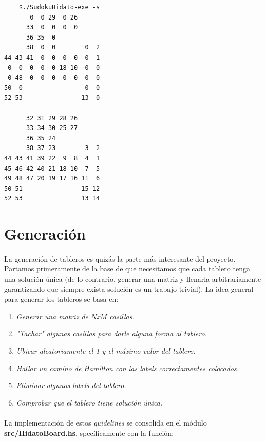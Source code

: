 \documentclass[a4paper, 12pt]{article}
\begin{document}
\begin{verbatim}
    $./SudokuHidato-exe -s
       0  0 29  0 26      
      33  0  0  0  0      
      36 35  0            
      38  0  0        0  2
44 43 41  0  0  0  0  0  1
 0  0  0  0  0 18 10  0  0
 0 48  0  0  0  0  0  0  0
50  0                 0  0
52 53                13  0

      32 31 29 28 26      
      33 34 30 25 27      
      36 35 24            
      38 37 23        3  2
44 43 41 39 22  9  8  4  1
45 46 42 40 21 18 10  7  5
49 48 47 20 19 17 16 11  6
50 51                15 12
52 53                13 14

\end{verbatim}

\section*{Generaci\'on}
\paragraph{}
La generaci\'on de tableros es quiz\'as la parte m\'as interesante del proyecto. Partamos primeramente de la
base de que necesitamos que cada tablero tenga una soluci\'on \'unica (de lo contrario, generar una matriz
y llenarla arbitrariamente garantizando que siempre exista soluci\'on es un trabajo trivial). La idea general
para generar los tableros se basa en:

\begin{enumerate}
   \item \textit{Generar una matriz de $N$x$M$ casillas.}
   \item \textit{"Tachar" algunas casillas para darle alguna forma al tablero.}
   \item \textit{Ubicar aleatoriamente el 1 y el m\'aximo valor del tablero.}
   \item \textit{Hallar un camino de Hamilton con las labels correctamentes colocados.}
   \item \textit{Eliminar algunos labels del tablero.}
   \item \textit{Comprobar que el tablero tiene soluci\'on \'unica.}
\end{enumerate}

\paragraph{}
La implementaci\'on de estos \textit{guidelines} se consolida en el m\'odulo \textbf{src/HidatoBoard.hs},
spec\'ificamente con la funci\'on:
\end{document}
